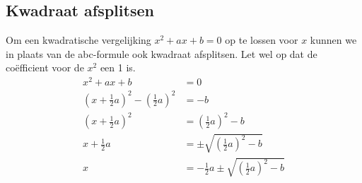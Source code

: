 \documentclass{article}
\begin{document}
		\subsection{Kwadraat afsplitsen}
			Om een kwadratische vergelijking $x^2 + ax + b = 0$ op te lossen voor $x$ kunnen we in plaats van de abc-formule ook kwadraat afsplitsen. Let wel op dat de co\"efficient voor de $x^2$ een 1 is.
			\begin{align*}
				x^2 + a x + b &= 0 \\
				\left(x + \frac{1}{2} a\right)^2 - \left( \frac{1}{2}a \right)^2 &= - b \\
				\left(x + \frac{1}{2} a\right)^2 &= \left( \frac{1}{2}a \right)^2 - b \\
				x + \frac{1}{2} a &= \pm \sqrt{\left( \frac{1}{2}a \right)^2 - b} \\
				x &= -  \frac{1}{2} a \pm \sqrt{\left(\frac{1}{2}a \right)^2 - b} 
			\end{align*}
\end{document}
